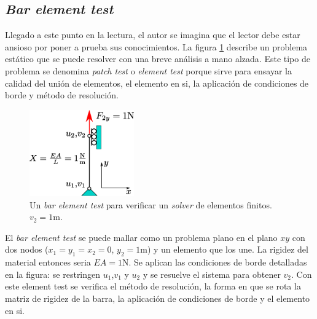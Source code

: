 \subsection*{\textit{Bar element test}}
Llegado a este punto en la lectura, el autor se imagina que el lector debe estar ansioso por poner a prueba sus conocimientos. La figura \ref{fig:barpatch} describe un problema estático que se puede resolver con una breve análisis a mano alzada. Este tipo de problema se denomina \textit{patch test} o \textit{element test} porque sirve para ensayar la calidad del unión de elementos, el elemento en si, la aplicación de condiciones de borde y método de resolución. 
\begin{figure}[htb!]
	\centering
	\includegraphics[width=0.4\textwidth]{fig/barpatch.eps}
	\caption{Un \textit{bar element test} para verificar un \textit{solver} de elementos finitos. $v_2=1$m.}
	\label{fig:barpatch}
\end{figure}

El \textit{bar element test} se puede mallar como un problema plano en el plano $xy$ con dos nodos ($x_1=y_1=x_2=0$, $y_2=1$m) y un elemento que los une. La rigidez del material entonces seria $EA=1$N. Se aplican las condiciones de borde detalladas en la figura: se restringen $u_1$,$v_1$ y $u_2$ y se resuelve el sistema para obtener $v_2$. Con este element test se verifica el método de resolución, la forma en que se rota la matriz de rigidez de la barra, la aplicación de condiciones de borde y el elemento en si. 


